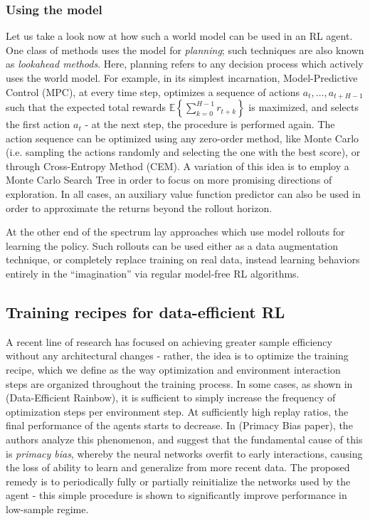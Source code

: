 \documentclass[twoside,11pt]{article}
\begin{document}
\subsubsection{Using the model}

Let us take a look now at how such a world model can be used in an RL agent. One class of methods uses the model for \emph{planning}; such techniques are also known as \emph{lookahead methods}. Here, planning refers to any decision process which actively uses the world model. For example, in its simplest incarnation, Model-Predictive Control (MPC), at every time step, optimizes a sequence of actions $a_t, \ldots, a_{t+H-1}$ such that the expected total rewards $\mathbb{E}\left\{\sum_{k=0}^{H-1} r_{t+k} \right\}$ is maximized, and selects the first action $a_t$ - at the next step, the procedure is performed again. The action sequence can be optimized using any zero-order method, like Monte Carlo (i.e. sampling the actions randomly and selecting the one with the best score), or through Cross-Entropy Method (CEM). A variation of this idea is to employ a Monte Carlo Search Tree in order to focus on more promising directions of exploration. In all cases, an auxiliary value function predictor can also be used in order to approximate the returns beyond the rollout horizon.

At the other end of the spectrum lay approaches which use model rollouts for learning the policy. Such rollouts can be used either as a data augmentation technique, or completely replace training on real data, instead learning behaviors entirely in the ``imagination'' via regular model-free RL algorithms.

\subsection{Training recipes for data-efficient RL}\label{train_recipes}

A recent line of research has focused on achieving greater sample efficiency without any architectural changes - rather, the idea is to optimize the training recipe, which we define as the way optimization and environment interaction steps are organized throughout the training process. In some cases, as shown in (Data-Efficient Rainbow), it is sufficient to simply increase the frequency of optimization steps per environment step. At sufficiently high replay ratios, the final performance of the agents starts to decrease. In (Primacy Bias paper), the authors analyze this phenomenon, and suggest that the fundamental cause of this is \emph{primacy bias}, whereby the neural networks overfit to early interactions, causing the loss of ability to learn and generalize from more recent data. The proposed remedy is to periodically fully or partially reinitialize the networks used by the agent - this simple procedure is shown to significantly improve performance in low-sample regime.
\end{document}
